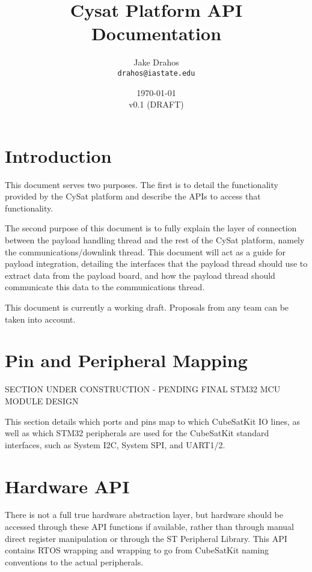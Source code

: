 \documentclass{article}
\begin{document}
\title{Cysat Platform API Documentation}
\author{Jake Drahos \\ \texttt{drahos@iastate.edu}}
\date{\today\\v0.1 (DRAFT)}

\maketitle

\tableofcontents

\section{Introduction}
This document serves two purposes. The first is to detail the functionality 
provided by the CySat platform and
describe the APIs to access that functionality.

The second purpose of this document is to fully explain the layer of connection
between the payload handling thread and the rest of the CySat platform, namely
the communications/downlink thread. This document will act as a guide for
payload integration, detailing the interfaces that the payload thread should
 use
to extract data from the payload board, and how the payload thread should 
communicate this data to the communications thread.

This document is currently a working draft. Proposals from any team can be taken
into account.

\section{Pin and Peripheral Mapping}

SECTION UNDER CONSTRUCTION - PENDING FINAL STM32 MCU MODULE DESIGN

This section details which ports and pins map to which CubeSatKit IO lines,
as well as which STM32 peripherals are used for the CubeSatKit standard 
interfaces, such as System I2C, System SPI, and UART1/2.

\section{Hardware API}
There is not a full true hardware abstraction layer, but hardware should be
accessed through these API functions if available, rather than through manual
direct register manipulation or through the ST Peripheral Library. This API
contains RTOS wrapping and wrapping to go from CubeSatKit naming conventions
to the actual peripherals.
\end{document}
